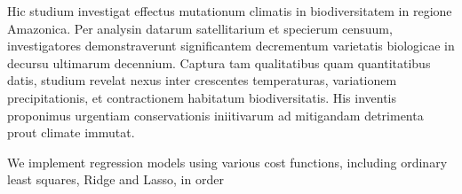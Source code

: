 Hic studium investigat effectus mutationum climatis in biodiversitatem in regione Amazonica. Per analysin datarum satellitarium et specierum censuum, investigatores demonstraverunt significantem decrementum varietatis biologicae in decursu ultimarum decennium. Captura tam qualitatibus quam quantitatibus datis, studium revelat nexus inter crescentes temperaturas, variationem precipitationis, et contractionem habitatum biodiversitatis. His inventis proponimus urgentiam conservationis iniitivarum ad mitigandam detrimenta prout climate immutat.

We implement regression models using various cost functions, including ordinary least squares, Ridge and Lasso, in order

